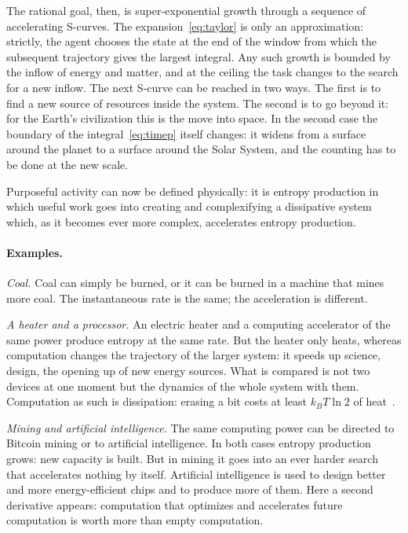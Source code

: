 \documentclass[11pt,a4paper]{article}
\begin{document}
The rational goal, then, is super-exponential growth through a sequence of accelerating S-curves. The expansion~\eqref{eq:taylor} is only an approximation: strictly, the agent chooses the state at the end of the window from which the subsequent trajectory gives the largest integral. Any such growth is bounded by the inflow of energy and matter, and at the ceiling the task changes to the search for a new inflow. The next S-curve can be reached in two ways. The first is to find a new source of resources inside the system. The second is to go beyond it: for the Earth's civilization this is the move into space. In the second case the boundary of the integral~\eqref{eq:timep} itself changes: it widens from a surface around the planet to a surface around the Solar System, and the counting has to be done at the new scale.

Purposeful activity can now be defined physically: it is entropy production in which useful work goes into creating and complexifying a dissipative system which, as it becomes ever more complex, accelerates entropy production.

\paragraph{Examples.}
\emph{Coal.} Coal can simply be burned, or it can be burned in a machine that mines more coal. The instantaneous rate is the same; the acceleration is different.

\emph{A heater and a processor.} An electric heater and a computing accelerator of the same power produce entropy at the same rate. But the heater only heats, whereas computation changes the trajectory of the larger system: it speeds up science, design, the opening up of new energy sources. What is compared is not two devices at one moment but the dynamics of the whole system with them. Computation as such is dissipation: erasing a bit costs at least $k_BT\ln2$ of heat~\cite{landauer1961}.

\emph{Mining and artificial intelligence.} The same computing power can be directed to Bitcoin mining or to artificial intelligence. In both cases entropy production grows: new capacity is built. But in mining it goes into an ever harder search that accelerates nothing by itself. Artificial intelligence is used to design better and more energy-efficient chips and to produce more of them. Here a second derivative appears: computation that optimizes and accelerates future computation is worth more than empty computation.
\end{document}
